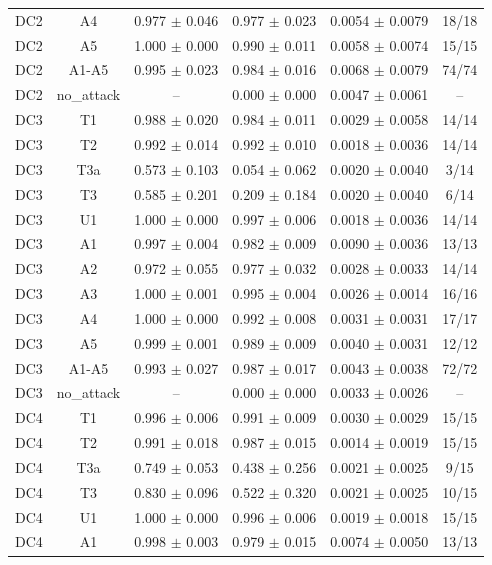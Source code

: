 \begin{tabular}{lccccc}
DC2 & A4 & 0.977 $\pm$ 0.046 & 0.977 $\pm$ 0.023 & 0.0054 $\pm$ 0.0079 & 18/18 \\
DC2 & A5 & 1.000 $\pm$ 0.000 & 0.990 $\pm$ 0.011 & 0.0058 $\pm$ 0.0074 & 15/15 \\
DC2 & A1-A5 & 0.995 $\pm$ 0.023 & 0.984 $\pm$ 0.016 & 0.0068 $\pm$ 0.0079 & 74/74 \\
DC2 & no\_attack & -- & 0.000 $\pm$ 0.000 & 0.0047 $\pm$ 0.0061 & -- \\
DC3 & T1 & 0.988 $\pm$ 0.020 & 0.984 $\pm$ 0.011 & 0.0029 $\pm$ 0.0058 & 14/14 \\
DC3 & T2 & 0.992 $\pm$ 0.014 & 0.992 $\pm$ 0.010 & 0.0018 $\pm$ 0.0036 & 14/14 \\
DC3 & T3a & 0.573 $\pm$ 0.103 & 0.054 $\pm$ 0.062 & 0.0020 $\pm$ 0.0040 & 3/14 \\
DC3 & T3 & 0.585 $\pm$ 0.201 & 0.209 $\pm$ 0.184 & 0.0020 $\pm$ 0.0040 & 6/14 \\
DC3 & U1 & 1.000 $\pm$ 0.000 & 0.997 $\pm$ 0.006 & 0.0018 $\pm$ 0.0036 & 14/14 \\
DC3 & A1 & 0.997 $\pm$ 0.004 & 0.982 $\pm$ 0.009 & 0.0090 $\pm$ 0.0036 & 13/13 \\
DC3 & A2 & 0.972 $\pm$ 0.055 & 0.977 $\pm$ 0.032 & 0.0028 $\pm$ 0.0033 & 14/14 \\
DC3 & A3 & 1.000 $\pm$ 0.001 & 0.995 $\pm$ 0.004 & 0.0026 $\pm$ 0.0014 & 16/16 \\
DC3 & A4 & 1.000 $\pm$ 0.000 & 0.992 $\pm$ 0.008 & 0.0031 $\pm$ 0.0031 & 17/17 \\
DC3 & A5 & 0.999 $\pm$ 0.001 & 0.989 $\pm$ 0.009 & 0.0040 $\pm$ 0.0031 & 12/12 \\
DC3 & A1-A5 & 0.993 $\pm$ 0.027 & 0.987 $\pm$ 0.017 & 0.0043 $\pm$ 0.0038 & 72/72 \\
DC3 & no\_attack & -- & 0.000 $\pm$ 0.000 & 0.0033 $\pm$ 0.0026 & -- \\
DC4 & T1 & 0.996 $\pm$ 0.006 & 0.991 $\pm$ 0.009 & 0.0030 $\pm$ 0.0029 & 15/15 \\
DC4 & T2 & 0.991 $\pm$ 0.018 & 0.987 $\pm$ 0.015 & 0.0014 $\pm$ 0.0019 & 15/15 \\
DC4 & T3a & 0.749 $\pm$ 0.053 & 0.438 $\pm$ 0.256 & 0.0021 $\pm$ 0.0025 & 9/15 \\
DC4 & T3 & 0.830 $\pm$ 0.096 & 0.522 $\pm$ 0.320 & 0.0021 $\pm$ 0.0025 & 10/15 \\
DC4 & U1 & 1.000 $\pm$ 0.000 & 0.996 $\pm$ 0.006 & 0.0019 $\pm$ 0.0018 & 15/15 \\
DC4 & A1 & 0.998 $\pm$ 0.003 & 0.979 $\pm$ 0.015 & 0.0074 $\pm$ 0.0050 & 13/13 \\

\end{tabular}

